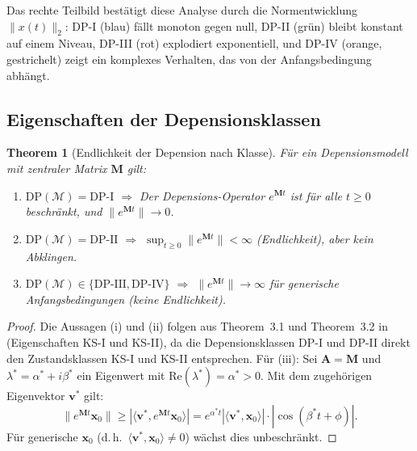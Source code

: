 ﻿\documentclass[12pt, a4paper]{article}
\newtheorem{theorem}{Theorem}[section]
\theoremstyle{definition}
\theoremstyle{remark}
\newcommand{\vx}{\bm{x}}
\newcommand{\vA}{\bm{A}}
\newcommand{\re}{\mathrm{Re}}
\newcommand{\DP}{\mathrm{DP}}
\begin{document}
Das rechte Teilbild bestätigt diese Analyse durch die Normentwicklung
$\|x(t)\|_2$: DP-I (blau) fällt monoton gegen null, DP-II (grün) bleibt konstant
auf einem Niveau, DP-III (rot) explodiert exponentiell, und DP-IV (orange, gestrichelt)
zeigt ein komplexes Verhalten, das von der Anfangsbedingung abhängt.

\subsection{Eigenschaften der Depensionsklassen}

\begin{theorem}[Endlichkeit der Depension nach Klasse]
\label{thm:endlichkeit_dp}
Für ein Depensionsmodell mit zentraler Matrix $\mathbf{M}$ gilt:
\begin{enumerate}[label=(\roman*)]
  \item $\DP(\mathcal{M}) = \DP\text{-I}$ $\Rightarrow$ Der Depensions-Operator
    $e^{\mathbf{M}t}$ ist für alle $t \geq 0$ beschränkt, und
    $\|e^{\mathbf{M}t}\| \to 0$.
  \item $\DP(\mathcal{M}) = \DP\text{-II}$ $\Rightarrow$
    $\sup_{t \geq 0}\|e^{\mathbf{M}t}\| < \infty$ (Endlichkeit), aber
    kein Abklingen.
  \item $\DP(\mathcal{M}) \in \{\DP\text{-III}, \DP\text{-IV}\}$ $\Rightarrow$
    $\|e^{\mathbf{M}t}\| \to \infty$ für generische Anfangsbedingungen
    (keine Endlichkeit).
\end{enumerate}
\end{theorem}

\begin{proof}
Die Aussagen (i) und (ii) folgen aus Theorem~3.1 und Theorem~3.2 in
\citet{epp2026sysstate} (Eigenschaften KS-I und KS-II), da die Depensionsklassen
DP-I und DP-II direkt den Zustandsklassen KS-I und KS-II entsprechen. Für (iii):
Sei $\vA = \mathbf{M}$ und $\lambda^* = \alpha^* + i\beta^*$ ein Eigenwert mit
$\re(\lambda^*) = \alpha^* > 0$. Mit dem zugehörigen Eigenvektor $\bm{v}^*$ gilt:
\[
  \|e^{\mathbf{M}t}\vx_0\| \geq |\langle\bm{v}^*, e^{\mathbf{M}t}\vx_0\rangle|
  = e^{\alpha^* t} |\langle\bm{v}^*, \vx_0\rangle| \cdot |\cos(\beta^* t + \phi)|.
\]
Für generische $\vx_0$ (d.\,h.\ $\langle\bm{v}^*, \vx_0\rangle \neq 0$) wächst
dies unbeschränkt. \qedhere
\end{proof}
\end{document}

